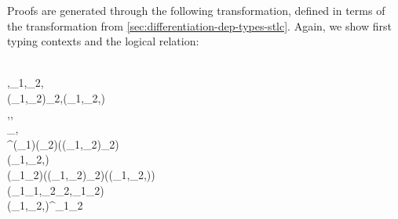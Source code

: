 Proofs are generated through the following transformation, defined in terms of
the transformation from \cref{sec:differentiation-dep-types-stlc}. Again, we
show first typing contexts and the logical relation:
\begin{hscode}\SaveRestoreHook
{}%
%
%
%
%
\>[3]{}\mean{\EmptyContext}\mathrel{=}\EmptyContext{}\<[E]%
\\
\>[3]{}\mathrel{=}\mean{\Gamma},_{1}\typcolon\tau,_{2}\typcolon\tau,{}\<[E]%
\\
\>[3]{}\<[5]%
\>[5]{}\typcolon(_{1},_{2})\in \Delta_2\mean{\tau},\typcolon(_{1},_{2},)\in \Delta{}\mean{\tau}{}\<[E]%
\\
\>[3]{}\mean{\Gamma,\alpha\typcolon\star}\mathrel{=}\mean{\Gamma},\alpha\typcolon\star,{}\<[E]%
\\
\>[3]{}\<[5]%
\>[5]{}\Delta_\alpha\typcolon\alpha\to \alpha\to \star,{}\<[E]%
\\
\>[3]{}\<[5]%
\>[5]{}^\alpha\typcolon\Pi (_{1}\typcolon\alpha)\hsforall \;(_{2}\typcolon\alpha)\;(\typcolon(_{1},_{2})\in \Delta_2\mean{\alpha})\to \lceil \star \rceil{}\<[E]%
\\[\blanklineskip]%
\>[3]{}(_{1},_{2},)\in \Delta{}\mean{\sigma\to \tau}\mathrel{=}{}\<[E]%
\\
\>[3]{}\<[5]%
\>[5]{}\Pi (_{1}\;_{2}\typcolon\sigma)\hsforall \;(\typcolon(_{1},_{2})\in \Delta_2\mean{\sigma})\;(\typcolon(_{1},_{2},)\in \Delta{}\mean{\sigma})\<[E]%
\\
\>[5]{}\<[7]%
\>[7]{}(_{1}\;_{1},_{2}\;_{2},\;_{1}\;_{2}\;)\in \Delta{}\mean{\tau}{}\<[E]%
\\
\>[3]{}(_{1},_{2},)\in \Delta{}\mean{\alpha}\mathrel{=}^\alpha\;_{1}\;_{2}\;\<[E]%
\ColumnHook
\end{hscode}\resethooks
